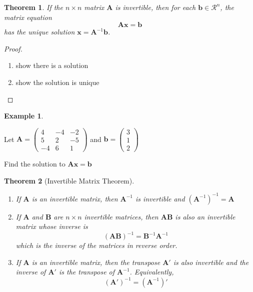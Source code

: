 \documentclass[
]{book}
\newtheorem{theorem}{Theorem}[chapter]
\theoremstyle{definition}
\theoremstyle{definition}
\newtheorem{example}{Example}[chapter]
\theoremstyle{definition}
\theoremstyle{remark}
\begin{document}
\begin{theorem}
\protect\hypertarget{thm:unnamed-chunk-135}{}{\label{thm:unnamed-chunk-135} }If the \(n \times n\) matrix \(\mathbf{A}\) is invertible, then for each \(\mathbf{b} \in \mathcal{R}^n\), the matrix equation
\[
\mathbf{A} \mathbf{x} = \mathbf{b}
\]
has the unique solution \(\mathbf{x} = \mathbf{A}^{-1} \mathbf{b}\).
\end{theorem}

\begin{proof}
{}

\begin{enumerate}
\def\labelenumi{\arabic{enumi})}
\item
  show there is a solution
\item
  show the solution is unique
\end{enumerate}
\end{proof}

\begin{example}
\protect\hypertarget{exm:unlabeled-div-77}{}\label{exm:unlabeled-div-77}

Let \(\mathbf{A} = \begin{pmatrix} 4 & -4 & -2 \\ 5 & 2 & -5 \\ -4 & 6 & 1 \end{pmatrix}\) and \(\mathbf{b} = \begin{pmatrix} 3 \\ 1 \\ 2 \end{pmatrix}\)

Find the solution to \(\mathbf{A} \mathbf{x} = \mathbf{b}\)

\end{example}

\begin{theorem}[Invertible Matrix Theorem]
\protect\hypertarget{thm:invertible-matrix-1}{}{\label{thm:invertible-matrix-1} {} }

\begin{enumerate}
\def\labelenumi{\arabic{enumi})}
\item
  If \(\mathbf{A}\) is an invertible matrix, then \(\mathbf{A}^{-1}\) is invertible and \((\mathbf{A}^{-1})^{-1} = \mathbf{A}\)
\item
  If \(\mathbf{A}\) and \(\mathbf{B}\) are \(n \times n\) invertible matrices, then \(\mathbf{A} \mathbf{B}\) is also an invertible matrix whose inverse is
  \[
  (\mathbf{A}\mathbf{B})^{-1} = \mathbf{B}^{-1}\mathbf{A}^{-1}
  \]
  which is the inverse of the matrices in reverse order.
\item
  If \(\mathbf{A}\) is an invertible matrix, then the transpose \(\mathbf{A}'\) is also invertible and the inverse of \(\mathbf{A}'\) is the transpose of \(\mathbf{A}^{-1}\). Equivalently,
  \[
  (\mathbf{A}')^{-1} = (\mathbf{A}^{-1})'
  \]
\end{enumerate}
\end{theorem}
\end{document}
